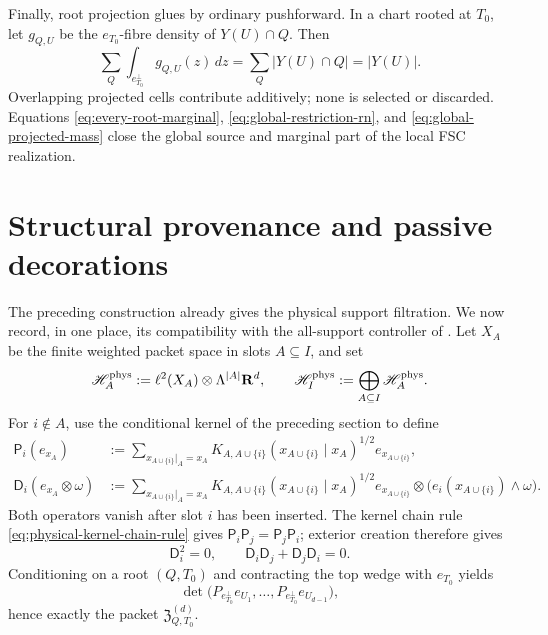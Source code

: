 \documentclass[11pt]{article}
\newcommand{\R}{\mathbf R}
\begin{document}
Finally, root projection glues by ordinary pushforward.  In a chart rooted at
\(T_0\), let \(g_{Q,U}\) be the \(e_{T_0}\)-fibre density of
\(Y(U)\cap Q\).  Then
\begin{equation}\label{eq:global-projected-mass}
 \sum_Q\int_{e_{T_0}^\perp}g_{Q,U}(z)\,dz
 =
 \sum_Q|Y(U)\cap Q|
 =
 |Y(U)|.
\end{equation}
Overlapping projected cells contribute additively; none is selected or
discarded.  Equations \eqref{eq:every-root-marginal},
\eqref{eq:global-restriction-rn}, and
\eqref{eq:global-projected-mass} close the global source and marginal part of
the local FSC realization.

\section{Structural provenance and passive decorations}

The preceding construction already gives the physical support filtration.  We
now record, in one place, its compatibility with the all-support controller of
\cite{UnifiedTower}.  Let \(X_A\) be the finite weighted packet space in slots
\(A\subseteq I\), and set
\[
 \mathscr H_A^{\rm phys}:=\ell^2(X_A)\otimes\Lambda^{|A|}\R^d,
 \qquad
 \mathscr H_I^{\rm phys}:=\bigoplus_{A\subseteq I}\mathscr H_A^{\rm phys}.
\]
For \(i\notin A\), use the conditional kernel of the preceding section to
define
\begin{equation}\label{eq:physical-koszul-operator}
 \begin{aligned}
 \mathsf P_i(e_{x_A})
 &:=
 \sum_{x_{A\cup\{i\}}|_A=x_A}
 K_{A,A\cup\{i\}}(x_{A\cup\{i\}}\mid x_A)^{1/2}
 e_{x_{A\cup\{i\}}},\\
 \mathsf D_i(e_{x_A}\otimes\omega)
 &:=
 \sum_{x_{A\cup\{i\}}|_A=x_A}
 K_{A,A\cup\{i\}}(x_{A\cup\{i\}}\mid x_A)^{1/2}
 e_{x_{A\cup\{i\}}}\otimes
 \bigl(e_i(x_{A\cup\{i\}})\wedge\omega\bigr).
 \end{aligned}
\end{equation}
Both operators vanish after slot \(i\) has been inserted.  The kernel chain
rule \eqref{eq:physical-kernel-chain-rule} gives
\(\mathsf P_i\mathsf P_j=\mathsf P_j\mathsf P_i\); exterior creation therefore
gives
\[
 \mathsf D_i^2=0,
 \qquad
 \mathsf D_i\mathsf D_j+\mathsf D_j\mathsf D_i=0.
\]
Conditioning on a root \((Q,T_0)\) and contracting the top wedge with
\(e_{T_0}\) yields
\[
 \det\bigl(P_{e_{T_0}^{\perp}}e_{U_1},\ldots,
 P_{e_{T_0}^{\perp}}e_{U_{d-1}}\bigr),
\]
hence exactly the packet \(\mathfrak Z^{(d)}_{Q,T_0}\).
\end{document}

